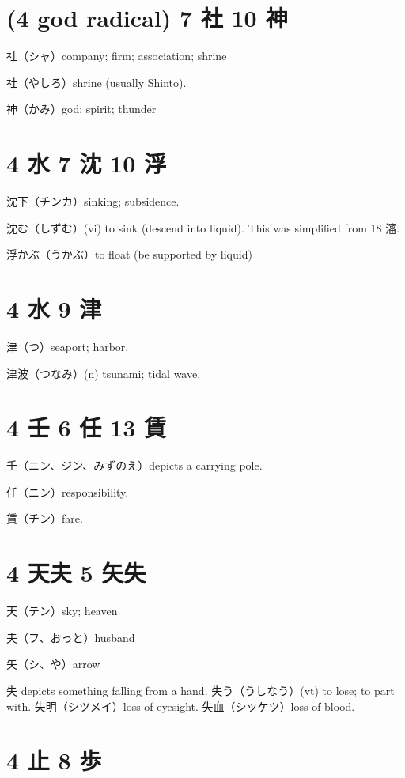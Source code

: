 \section{(4 god radical) 7 社 10 神}

社（シャ）company; firm; association; shrine

社（やしろ）shrine (usually Shinto).

神（かみ）god; spirit; thunder

\section{4 水 7 沈 10 浮}

沈下（チンカ）sinking; subsidence.

沈む（しずむ）(vi) to sink (descend into liquid).
This was simplified from 18 瀋.

浮かぶ（うかぶ）to float (be supported by liquid)

\section{4 水 9 津}

津（つ）seaport; harbor.

津波（つなみ）(n) tsunami; tidal wave.

\section{4 壬 6 任 13 賃}

壬（ニン、ジン、みずのえ）depicts a carrying pole.

任（ニン）responsibility.

賃（チン）fare.

\section{4 天夫 5 矢失}

天（テン）sky; heaven

夫（フ、おっと）husband

矢（シ、や）arrow

失 depicts something falling from a hand.
失う（うしなう）(vt) to lose; to part with.
失明（シツメイ）loss of eyesight.
失血（シッケツ）loss of blood.

\section{4 止 8 歩}

